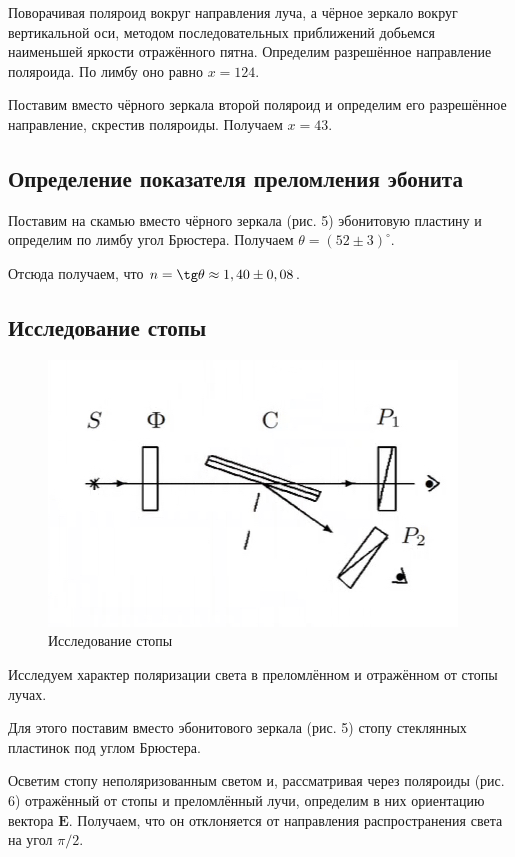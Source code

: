 \documentclass[a4paper,12pt]{article}
\begin{document}
Поворачивая поляроид вокруг направления луча, а чёрное зеркало вокруг вертикальной оси, методом последовательных приближений добьемся
наименьшей яркости отражённого пятна. Определим разрешённое направление поляроида. По лимбу оно равно $ x = 124 $. 

Поставим вместо чёрного зеркала второй поляроид и определим
его разрешённое направление, скрестив поляроиды. Получаем $ x = 43 $. 

\subsection{Определение показателя преломления эбонита}

Поставим на скамью вместо чёрного зеркала (рис. 5) эбонитовую
пластину и определим по лимбу угол Брюстера. Получаем $ \theta =(52 \pm 3) ^\circ$. 

Отсюда получаем, что $ n = \tg \theta \approx 1,40 \pm 0,08 $. 

\subsection{Исследование стопы}

\begin{figure}
	\includegraphics[width=\linewidth]{6}
	\caption{Исследование стопы}
	\label{ris 6}
\end{figure}

Исследуем характер поляризации света в преломлённом и отражённом от стопы лучах. 

Для этого поставим вместо эбонитового зеркала (рис. 5) стопу стеклянных пластинок под углом Брюстера.

Осветим стопу неполяризованным светом и, рассматривая через поляроиды (рис. 6) отражённый от стопы и преломлённый лучи, определим в них ориентацию вектора $ \mathbf{E} $. Получаем, что он отклоняется от направления распространения света на угол $ \pi/2 $.
\end{document}
